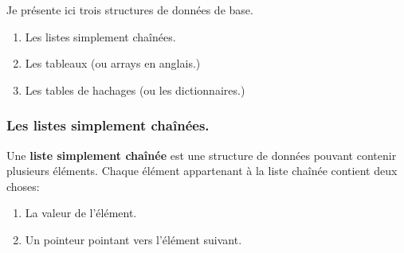 \documentclass[a4paper, 12pt]{article}
\numberwithin{equation}{subsection}
\begin{document}
Je présente ici trois structures de données de base.
\begin{enumerate}
  \item Les listes simplement chaînées.
  \item Les tableaux (ou arrays en anglais.)
  \item Les tables de hachages (ou les dictionnaires.) \\[0.2cm]
\end{enumerate}

\subsubsection{Les listes simplement chaînées.}
Une {\bf liste simplement chaînée} est une structure de données pouvant contenir plusieurs éléments. Chaque élément appartenant à la liste chaînée contient deux choses:
\begin{enumerate}
  \item La valeur de l'élément.
  \item Un pointeur pointant vers l'élément suivant. \\[0.2cm]
\end{enumerate}
\end{document}
